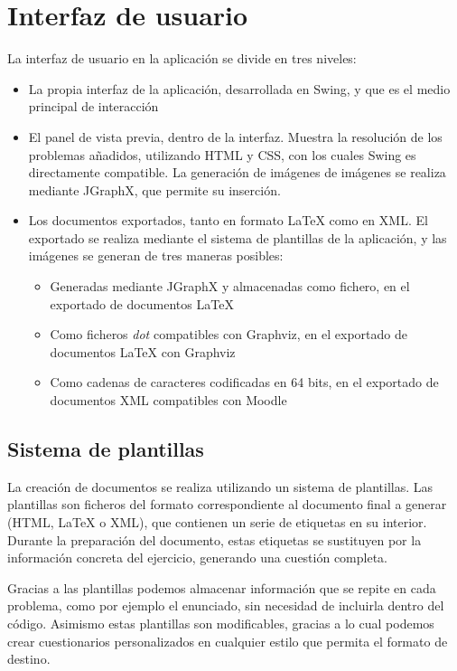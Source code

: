 \section{Interfaz de usuario}
La interfaz de usuario en la aplicación se divide en tres niveles:
\begin{itemize}
	\item La propia interfaz de la aplicación, desarrollada en Swing, y que es el medio principal de interacción
	\item El panel de vista previa, dentro de la interfaz.
	Muestra la resolución de los problemas añadidos, utilizando HTML y CSS, con los cuales Swing es directamente compatible.
	La generación de imágenes de imágenes se realiza mediante JGraphX, que permite su inserción.
	\item Los documentos exportados, tanto en formato \LaTeX{} como en XML.
	El exportado se realiza mediante el sistema de plantillas de la aplicación, y las imágenes se generan de tres maneras posibles:
	\begin{itemize}
		\item Generadas mediante JGraphX y almacenadas como fichero, en el exportado de documentos \LaTeX{}
		\item Como ficheros \emph{dot} compatibles con Graphviz, en el exportado de documentos \LaTeX{} con Graphviz
		\item Como cadenas de caracteres codificadas en 64 bits, en el exportado de documentos XML compatibles con Moodle
	\end{itemize}
\end{itemize}

\subsection{Sistema de plantillas}
La creación de documentos se realiza utilizando un sistema de plantillas.
Las plantillas son ficheros del formato correspondiente al documento final a generar (HTML, \LaTeX{} o XML), que contienen un serie de etiquetas en su interior.
Durante la preparación del documento, estas etiquetas se sustituyen por la información concreta del ejercicio, generando una cuestión completa.

Gracias a las plantillas podemos almacenar información que se repite en cada problema, como por ejemplo el enunciado, sin necesidad de incluirla dentro del código.
Asimismo estas plantillas son modificables, gracias a lo cual podemos crear cuestionarios personalizados en cualquier estilo que permita el formato de destino.

